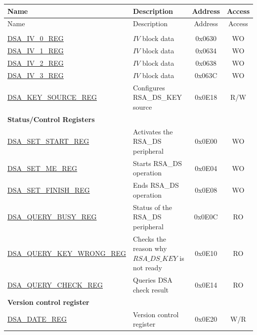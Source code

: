 


\newif\ifdigsiglatest
\iftagged{ESP32-P4-latest}{\digsiglatesttrue}{\digsiglatestfalse}
\begin{longtable}{ | p{5.2cm} | p{6.6cm} | c| c| }
\hline\rowcolor{lightgray}
Name & Description &  Address & Access \\ \hline
\endfirsthead
        \hline
        \rowcolor{lightgray}
Name & Description &  Address & Access \\ \hline

        \endhead
        \endfoot
\multicolumn{4}{|l|}{\textbf{Configuration Registers}} \\ \hline
\hyperref[regdesc:DSAIVREG]{DSA\_IV\_0\_REG}               & \begin{math}IV\end{math} block data         & 0x0630 & WO \\ \hline
\hyperref[regdesc:DSAIVREG]{DSA\_IV\_1\_REG}               & \begin{math}IV\end{math} block data          & 0x0634 & WO \\ \hline
\hyperref[regdesc:DSAIVREG]{DSA\_IV\_2\_REG}               & \begin{math}IV\end{math} block data          & 0x0638 & WO \\ \hline
\hyperref[regdesc:DSAIVREG]{DSA\_IV\_3\_REG}               & \begin{math}IV\end{math} block data           & 0x063C & WO \\ \hline
\ifdigsiglatest
\hyperref[regdesc:DSAKEYSOURCEREG]{DSA\_KEY\_SOURCE\_REG} & Configures RSA\_DS\_KEY source & 0x0E18 & R/W \\ \hline
\fi
\multicolumn{4}{|l|}{\textbf{Status/Control Registers}} \\ \hline
\hyperref[regdesc:DSASETSTARTREG]{DSA\_SET\_START\_REG}               & Activates the RSA\_DS peripheral     & 0x0E00 & WO \\ \hline
\hyperref[regdesc:DSASETMEREG]{DSA\_SET\_ME\_REG}                     & Starts RSA\_DS operation       & 0x0E04 & WO \\ \hline
\hyperref[regdesc:DSASETFINISHREG]{DSA\_SET\_FINISH\_REG}             & Ends RSA\_DS operation         & 0x0E08 & WO \\ \hline
\hyperref[regdesc:DSAQUERYBUSYREG]{DSA\_QUERY\_BUSY\_REG}             & Status of the RSA\_DS peripheral & 0x0E0C & RO \\ \hline
\hyperref[regdesc:DSAQUERYKEYWRONGREG]{DSA\_QUERY\_KEY\_WRONG\_REG}   & Checks the reason why \begin{math}RSA\_DS\_KEY\end{math} is not ready       & 0x0E10 & RO \\ \hline
\hyperref[regdesc:DSAQUERYCHECKREG]{DSA\_QUERY\_CHECK\_REG}           & Queries DSA check result    & 0x0E14 & RO \\ \hline
\multicolumn{4}{|l|}{\textbf{Version control register}} \\ \hline
\hyperref[regdesc:DSADATEREG]{DSA\_DATE\_REG}                   & Version control register   & 0x0E20 & W/R \\ \hline
\end{longtable}
